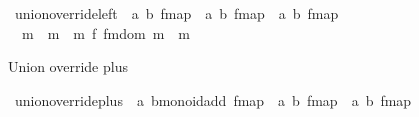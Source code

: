 \begin{isabellebody}
\isamarkupfalse%
\ union{\isacharunderscore}{\kern0pt}override{\isacharunderscore}{\kern0pt}left\ {\isacharcolon}{\kern0pt}{\isacharcolon}{\kern0pt}\ {\isachardoublequoteopen}{\isacharparenleft}{\kern0pt}{\isacharprime}{\kern0pt}a{\isacharcomma}{\kern0pt}\ {\isacharprime}{\kern0pt}b{\isacharparenright}{\kern0pt}\ fmap\ {\isasymRightarrow}\ {\isacharparenleft}{\kern0pt}{\isacharprime}{\kern0pt}a{\isacharcomma}{\kern0pt}\ {\isacharprime}{\kern0pt}b{\isacharparenright}{\kern0pt}\ fmap\ {\isasymRightarrow}\ {\isacharparenleft}{\kern0pt}{\isacharprime}{\kern0pt}a{\isacharcomma}{\kern0pt}\ {\isacharprime}{\kern0pt}b{\isacharparenright}{\kern0pt}\ fmap{\isachardoublequoteclose}\isanewline
\ \ {\isacharparenleft}{\kern0pt}\ {\isacartoucheopen}{\isasymunion}\isactrlsub {\isasymleftarrow}{\isacartoucheclose}\ {}{}{}{\isacharparenright}{\kern0pt}\isanewline
{}\isanewline
\ \ {\isachardoublequoteopen}m\ {\isasymunion}\isactrlsub {\isasymleftarrow}\ m\ {\isasymequiv}\ m\ {\isacharplus}{\kern0pt}{\isacharplus}{\kern0pt}\isactrlsub f\ {\isacharparenleft}{\kern0pt}fmdom{\isacharprime}{\kern0pt}\ m\ {\isasymlhd}{\isacharslash}{\kern0pt}\ m%
\begin{isamarkuptext}%
Union override plus%
\end{isamarkuptext}\isamarkuptrue%
\isamarkupfalse%
\ union{\isacharunderscore}{\kern0pt}override{\isacharunderscore}{\kern0pt}plus\ {\isacharcolon}{\kern0pt}{\isacharcolon}{\kern0pt}\ {\isachardoublequoteopen}{\isacharparenleft}{\kern0pt}{\isacharprime}{\kern0pt}a{\isacharcomma}{\kern0pt}\ {\isacharprime}{\kern0pt}b{\isacharcolon}{\kern0pt}{\isacharcolon}{\kern0pt}monoid{\isacharunderscore}{\kern0pt}add{\isacharparenright}{\kern0pt}\ fmap\ {\isasymRightarrow}\ {\isacharparenleft}{\kern0pt}{\isacharprime}{\kern0pt}a{\isacharcomma}{\kern0pt}\ {\isacharprime}{\kern0pt}b{\isacharparenright}{\kern0pt}\ fmap\ {\isasymRightarrow}\ {\isacharparenleft}{\kern0pt}{\isacharprime}{\kern0pt}a{\isacharcomma}{\kern0pt}\ {\isacharprime}{\kern0pt}b{\isacharparenright}{\kern0pt}\ fmap{\isachardoublequoteclose}\isanewline
\ \ {\isacharparenleft}{\kern0pt}\ {\isacartoucheopen}{\isasymunion}\isactrlsub {\isacharplus}{\kern0pt}{\isacartoucheclose}\ {}{}{}{\isacharparenright}{\kern0pt}\isanewline

\end{isabellebody}
